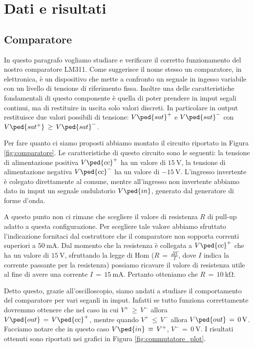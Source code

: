 \section*{Dati e risultati}

\subsection*{Comparatore}

In questo paragrafo vogliamo studiare e verificare il corretto funzionamento del nostro comparatore LM311. Come suggerisce il nome stesso un comparatore, in elettronica, è un dispositivo che mette a confronto un segnale in ingesso variabile con un livello di tensione di riferimento fissa. Inoltre una delle caratteristiche fondamentali di questo componente è quella di poter prendere in imput segali continui, ma di restituire in uscita solo valori discreti. In particolare in output restituisce due valori possibili di tensione: $V\ped{sat}^+$ e $V\ped{sat}^-$ con $V\ped{sat^+}\,\geq\,V\ped{sat}^-$.

Per fare quanto ci siamo proposti abbiamo montato il circuito riportato in Figura \ref{fig:comparatore}. Le caratteristiche di questo circuito sono le seguenti: la tensione di alimentazione positiva $V\ped{cc}^+$ ha un valore di $\SI{+15}{\volt}$, la tensione di alimentazione negativa $V\ped{cc}^-$ ha un valore di $\SI{-15}{\volt}$. L'ingresso invertente è colegato direttamente al comune, mentre all'ingresso non invertente abbiamo dato in imput un segnale ondulatorio $V\ped{in}$, generato dal generatore di forme d'onda.

A questo punto non ci rimane che scegliere il valore di resistenza $R$ di pull-up adatto a questa configurazione. Per scegliere tale valore abbiamo sfruttato l'indicazione fornitaci dal costruttore che il comparatore non sopporta correnti superiori a $\SI{50}{\milli\ampere}$. Dal momento che la resistenza è collegata a $V\ped{cc}^+$ che ha un valore di $\SI{+15}{\volt}$, sfruttando la legge di Hom ($R\,=\,\frac{\Delta V}{I}$, dove $I$ indica la corrente passante per la resistenza) possiamo ricavare il valore di resistenza utile al fine di avere una corrente $I\,=\,\SI{15}{\milli\ampere}$. Pertanto otteniamo che $R\,=\,\SI{10}{\kilo\ohm}$.

Detto questo, grazie all'oscilloscopio, siamo andati a studiare il comportamento del comparatore per vari seganli in imput. Infatti se tutto funziona correttamente dovremmo ottenere che nel caso in cui $V^+\,\geq\,V^-$ allora $V\ped{out}\,=\,V\ped{cc}^+$, mentre quando $V^+\,\leq\,V^-$ allora $V\ped{out}\,=\,\SI{0}{\volt}$. Facciamo notare che in questo caso $V\ped{in}\,\equiv\,V^+$, $V^-\,=\,\SI{0}{\volt}$. I risultati ottenuti sono riportati nei grafici in Figura \ref{fig:commutatore_plot}.

